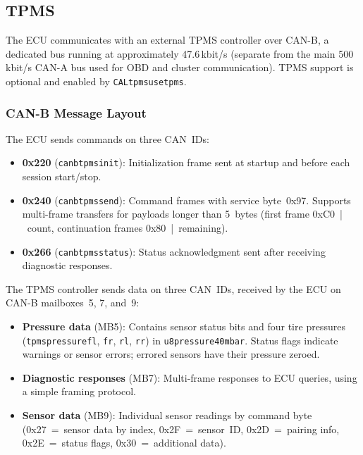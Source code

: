 \documentclass[a4paper,11pt]{article}
\renewcommand{\_}{\oldunderscore\allowbreak}
\begin{document}
\subsection{TPMS}

The ECU communicates with an external TPMS controller over CAN-B, a dedicated
bus running at approximately 47.6\,kbit/s (separate from the main 500\,kbit/s
CAN-A bus used for OBD and cluster communication). TPMS support is optional and
enabled by \texttt{CAL\_tpms\_use\_tpms}.

\subsubsection*{CAN-B Message Layout}

The ECU sends commands on three CAN~IDs:

\begin{itemize}
\item \textbf{0x220} (\texttt{can\_b\_tpms\_init}): Initialization frame sent
      at startup and before each session start/stop.
\item \textbf{0x240} (\texttt{can\_b\_tpms\_send}): Command frames with
      service byte~0x97. Supports multi-frame transfers for payloads longer
      than 5~bytes (first frame 0xC0~|~count, continuation frames
      0x80~|~remaining).
\item \textbf{0x266} (\texttt{can\_b\_tpms\_status}): Status acknowledgment
      sent after receiving diagnostic responses.
\end{itemize}

The TPMS controller sends data on three CAN~IDs, received by the ECU on
CAN-B mailboxes~5, 7, and~9:

\begin{itemize}
\item \textbf{Pressure data} (MB5): Contains sensor status bits and four tire
      pressures (\texttt{tpms\_pressure\_fl}, \texttt{\_fr}, \texttt{\_rl},
      \texttt{\_rr}) in \texttt{u8\_pressure\_40mbar}. Status flags indicate
      warnings or sensor errors; errored sensors have their pressure zeroed.
\item \textbf{Diagnostic responses} (MB7): Multi-frame responses to ECU
      queries, using a simple framing protocol.
\item \textbf{Sensor data} (MB9): Individual sensor readings by command byte
      (0x27~=~sensor data by index, 0x2F~=~sensor~ID, 0x2D~=~pairing info,
      0x2E~=~status flags, 0x30~=~additional data).
\end{itemize}
\end{document}
